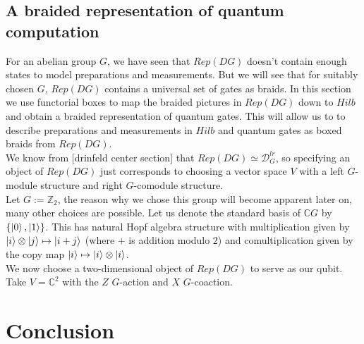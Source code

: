 \documentclass{article}
\begin{document}
\subsection{A braided representation of quantum computation}
For an abelian group $G$, we have seen that $Rep(DG)$ doesn't contain enough states to model preparations and measurements. But we will see that for suitably chosen $G$, $Rep(DG)$ contains a universal set of gates as braids. In this section we use functorial boxes \cite{Mellies06} to map the braided pictures in $Rep(DG)$ down to $Hilb$ and obtain a braided representation of quantum gates. This will allow us to to describe preparations and measurements in $Hilb$ and quantum gates as boxed braids from $Rep(DG)$.\\
We know from [drinfeld center section] that $Rep(DG) \simeq \mathcal{D}_G^{lr}$, so specifying an object of $Rep(DG)$ just corresponds to choosing a vector space $V$ with a left $G$-module structure  and right $G$-comodule structure.\\
Let $G:= \mathbb{Z}_2$, the reason why we chose this group will become apparent later on, many other choices are possible. Let us denote the standard basis of $\mathbb{C}G$ by $\{ \ket{0}, \ket{1}\}$. This has natural Hopf algebra structure with multiplication given by $\ket{i}\otimes \ket{j} \mapsto \ket{i+j}$ (where $+$ is addition modulo $2$) and comultiplication given by the copy map $\ket{i} \mapsto \ket{i}\otimes \ket{i} $.\\
We now choose a two-dimensional object of $Rep(DG)$ to serve as our qubit. Take $V=\mathbb{C}^2$ with the $Z$ $G$-action and $X$ $G$-coaction.




\section{Conclusion}




\appendix
\end{document}
